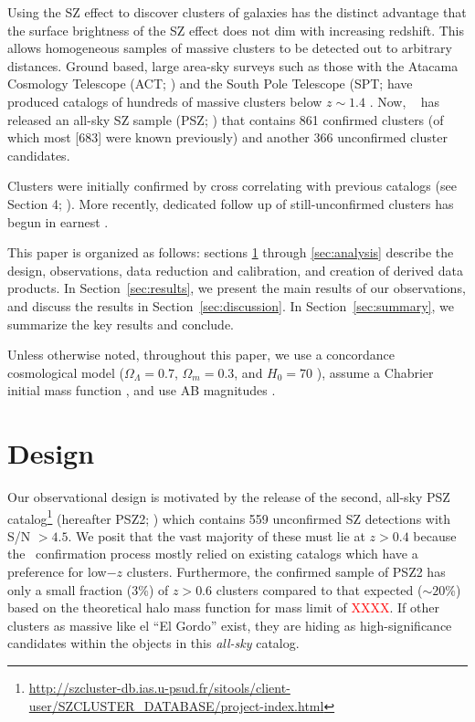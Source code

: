 \documentclass[apj, revtex4-1]{emulateapj}
\newcommand{\editorial}[1]{\textcolor{red}{#1}}
\begin{document}
Using the SZ effect to discover clusters of galaxies has the distinct advantage that the surface brightness of the SZ effect does not dim with increasing redshift. This allows homogeneous samples of massive clusters to be detected out to arbitrary distances. Ground based, large area-sky surveys such as those with the Atacama Cosmology Telescope (ACT; \citealt{Swetz2011}) and the South Pole Telescope (SPT; \citealt{Carlstrom2011} have produced catalogs of hundreds of massive clusters below $z \sim 1.4$ . Now, \planck\ \citep{Tauber2010, PlanckCollaboration2011} has released an all-sky SZ sample (PSZ; \citealt{PlanckCollaboration2014, PlanckCollaboration2015}) that contains 861 confirmed clusters (of which most [683] were known previously) and another 366 unconfirmed cluster candidates.

Clusters were initially confirmed by cross correlating with previous catalogs (see Section 4; \citealt{PlanckCollaboration2014}). More recently, dedicated follow up of still-unconfirmed clusters has begun in earnest .

This paper is organized as follows: sections \ref{sec:design} through \ref{sec:analysis} describe the design, observations, data reduction and calibration, and creation of derived data products. In Section~\ref{sec:results}, we present the main results of our observations, and discuss the results in Section~\ref{sec:discussion}. In Section~\ref{sec:summary}, we summarize the key results and conclude.

Unless otherwise noted, throughout this paper, we use a concordance cosmological model ($\Omega_\Lambda = 0.7$, $\Omega_m = 0.3$, and $H_0= 70$ \kms \permpc), assume a Chabrier initial mass function \citep{Chabrier2003}, and use AB magnitudes \citep{Oke1974}.

\section{Design}\label{sec:design}
Our observational design is motivated by the release of the second, all-sky PSZ catalog\footnote{\url{http://szcluster-db.ias.u-psud.fr/sitools/client-user/SZCLUSTER_DATABASE/project-index.html}} (hereafter PSZ2; \citealt{PlanckCollaboration2015}) which contains 559 unconfirmed SZ detections with S/N $> 4.5$. We posit that the vast majority of these must lie at $z>0.4$ because the \planck\ confirmation process \citep{PlanckCollaboration2014} mostly relied on existing catalogs which have a preference for low$-z$ clusters. Furthermore, the confirmed sample of PSZ2 has only a small fraction (3\%) of $z > 0.6$ clusters compared to that expected ($\sim20$\%) based on the theoretical halo mass function  for mass limit of \editorial{XXXX}. If other clusters as massive like el ``El Gordo'' exist, they are hiding as high-significance candidates within the objects in this {\it all-sky} catalog.
\end{document}
